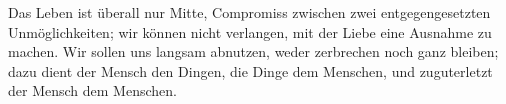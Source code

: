 Das Leben ist überall nur Mitte, Compromiss zwischen zwei entgegengesetzten Unmöglichkeiten; wir können nicht verlangen, mit der Liebe eine Ausnahme zu machen. Wir sollen uns langsam abnutzen, weder zerbrechen noch ganz bleiben; dazu dient der Mensch den Dingen, die Dinge dem Menschen, und zuguterletzt der Mensch dem Menschen.
\par

